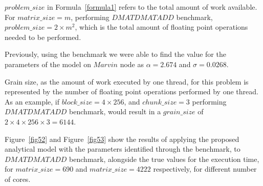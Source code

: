 $problem\_{size}$ in Formula~\ref{formula1} refers to the total amount of work available. For $matrix\_{size}=m$, performing $DMATDMATADD$ benchmark, $problem\_{size}=2\times{m^2}$, which is the total amount of floating point operations needed to be performed.
 
Previously, using the benchmark we were able to find the value for the parameters of the model on $Marvin$ node as $\alpha=2.674$ and $\sigma=0.0268$. 

Grain size, as the amount of work executed by one thread, for this problem is represented by the number of floating point operations performed by one thread. As an example, if $block\_{size}=4\times{256}$, and $chunk\_{size}=3$ performing $DMATDMATADD$ benchmark, would result in a $grain\_{size}$ of $2\times{4\times{256}\times{3}}=6144$. 

Figure~\ref{fig52} and Figure~\ref{fig53} show the results of applying the proposed analytical model with the parameters identified through the benchmark, to $DMATDMATADD$ benchmark, alongside the true values for the execution time, for $matrix\_{size}=690$ and $matrix\_{size}=4222$ respectively, for different number of cores. 


